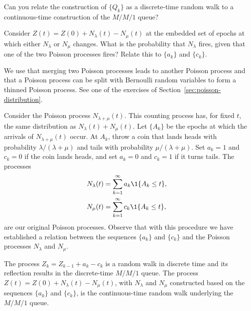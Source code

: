 \begin{exercise}
  Can you relate the construction of $\{Q_k\}$ as a discrete-time
  random walk to a continuous-time construction of the $M/M/1$ queue?
  \begin{hint}
Consider $Z(t)=Z(0) + N_\lambda( t) -N_\mu(t)$ at the embedded
    set of epochs at which either $N_\lambda$ or $N_\mu$ changes. What
    is the probability that $N_\lambda$ fires, given that one of the
    two Poisson processes fires? Relate this to $\{a_k\}$ and
    $\{c_k\}$.
  \end{hint}
    \begin{solution}
      We use that merging two Poisson processes leads to another
      Poisson process and that a Poisson process can be split with
      Bernoulli random variables to form a thinned Poisson
      process. See one of the exercises of
      Section~\ref{sec:poisson-distribution}. 

      Consider the Poisson process $N_{\lambda+\mu}(t)$. This counting
      process has, for fixed $t$, the same distribution as
      $N_\lambda(t)+N_\mu(t)$. Let $\{A_k\}$ be the epochs at which
      the arrivals of $N_{\lambda+\mu}(t)$ occur. At $A_k$, throw a
      coin that lands heads with probability $\lambda/(\lambda+\mu)$
      and tails with probability $\mu/(\lambda+\mu)$. Set $a_k=1$ and
      $c_k=0$ if the coin lands heads, and set $a_k=0$ and $c_k=1$ if
      it turns tails. The processes
      \begin{align*}
        N_\lambda(t) &= \sum_{k=1}^\infty a_k \1{A_k \leq t},\\
        N_\mu(t) &= \sum_{k=1}^\infty c_k \1{A_k \leq t},
      \end{align*}
      are our original Poisson processes.  Observe that with this
      procedure we have established a relation between the sequences
      $\{a_k\}$ and $\{c_k\}$ and the Poisson processes $N_\lambda$ and $N_\mu$. 

      The process $Z_k = Z_{k-1}+a_k - c_k$ is a random walk in
      discrete time and its reflection results in the discrete-time
      $M/M/1$ queue. The process
      $Z(t) = Z(0) + N_\lambda(t) - N_\mu(t)$, with $N_\lambda$ and
      $N_\mu$ constructed based on the sequences $\{a_k\}$ and
      $\{c_k\}$, is the continuous-time random walk underlying the
      $M/M/1$ queue.
    \end{solution}
\end{exercise}

